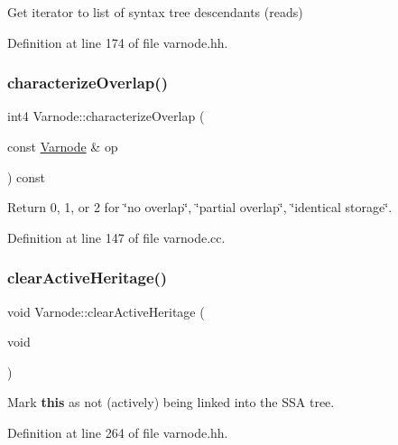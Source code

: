 Get iterator to list of syntax tree descendants (reads) 



Definition at line 174 of file varnode.\+hh.

\mbox{\label{class_varnode_aadb56ff77a01d15e7a66f3a3851bf8e1}} 
\subsubsection{\texorpdfstring{characterizeOverlap()}{characterizeOverlap()}}
{\footnotesize\ttfamily int4 Varnode\+::characterize\+Overlap (\begin{DoxyParamCaption}\item[{const \mbox{\hyperlink{class_varnode}{Varnode}} \&}]{op }\end{DoxyParamCaption}) const}



Return 0, 1, or 2 for \char`\"{}no overlap\char`\"{}, \char`\"{}partial overlap\char`\"{}, \char`\"{}identical storage\char`\"{}. 



Definition at line 147 of file varnode.\+cc.

\mbox{\label{class_varnode_acb345a601ccf9b3d13038d01b1963fa5}} 
\subsubsection{\texorpdfstring{clearActiveHeritage()}{clearActiveHeritage()}}
{\footnotesize\ttfamily void Varnode\+::clear\+Active\+Heritage (\begin{DoxyParamCaption}\item[{void}]{ }\end{DoxyParamCaption})\hspace{0.3cm}{\ttfamily [inline]}}



Mark {\bfseries{this}} as not (actively) being linked into the S\+SA tree. 



Definition at line 264 of file varnode.\+hh.

